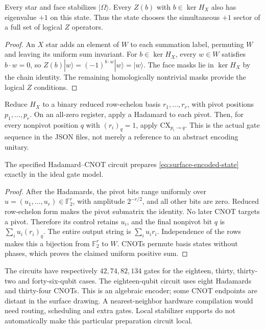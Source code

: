 \begin{proposition}
Every star and face stabilizes $|\Omega\rangle$.  Every $Z(b)$ with
$b\in\ker H_X$ also has eigenvalue $+1$ on this state.  Thus the state
chooses the simultaneous $+1$ sector of a full set of logical $Z$
operators.
\end{proposition}
\begin{proof}
An $X$ star adds an element of $W$ to each summation label, permuting
$W$ and leaving its uniform sum invariant.  For $b\in\ker H_X$,
every $w\in W$ satisfies $b\cdot w=0$, so
$Z(b)|w\rangle=(-1)^{b\cdot w}|w\rangle=|w\rangle$.
The face masks lie in $\ker H_X$ by the chain identity.  The remaining
homologically nontrivial masks provide the logical $Z$ conditions.
\end{proof}

Reduce $H_X$ to a binary reduced row-echelon basis
$r_1,\ldots,r_r$, with pivot positions $p_1,\ldots,p_r$.
On an all-zero register, apply a Hadamard to each pivot.  Then, for every
nonpivot position $q$ with $(r_i)_q=1$, apply
$\mathrm{CX}_{p_i\to q}$.  This is the actual gate sequence in the JSON
files, not merely a reference to an abstract encoding unitary.

\begin{theorem}
The specified Hadamard--CNOT circuit prepares
\eqref{eq:surface-encoded-state} exactly in the ideal gate model.
\end{theorem}
\begin{proof}
After the Hadamards, the pivot bits range uniformly over
$u=(u_1,\ldots,u_r)\in\mathbb F_2^r$, with amplitude $2^{-r/2}$,
and all other bits are zero.  Reduced row-echelon form makes the pivot
submatrix the identity.  No later CNOT targets a pivot.  Therefore its
control retains $u_i$, and the final nonpivot bit $q$ is
$\sum_i u_i(r_i)_q$.  The entire output string is
$\sum_i u_ir_i$.  Independence of the rows makes this a bijection
from $\mathbb F_2^r$ to $W$.  CNOTs permute basis states without phases,
which proves the claimed uniform positive sum.
\end{proof}

The circuits have respectively $42,74,82,134$ gates for the eighteen,
thirty, thirty-two and forty-six-qubit cases.  The eighteen-qubit circuit
uses eight Hadamards and thirty-four CNOTs.  This is an algebraic encoder;
some CNOT endpoints are distant in the surface drawing.  A nearest-neighbor
hardware compilation would need routing, scheduling and extra gates.
Local stabilizer supports do not automatically make this particular
preparation circuit local.

